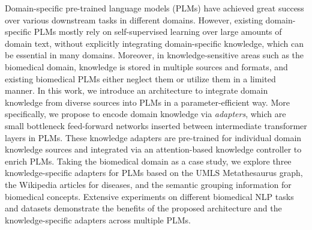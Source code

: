 Domain-specific pre-trained language models (PLMs) have achieved great success over various downstream tasks in different domains. However, existing domain-specific PLMs mostly rely on self-supervised learning over large amounts of domain text, without explicitly integrating domain-specific knowledge, which can be essential in many domains. Moreover, in knowledge-sensitive areas such as the biomedical domain, knowledge is stored in multiple sources and formats, and existing biomedical PLMs either neglect them or utilize them in a limited manner. In this work, we introduce an architecture to integrate domain knowledge from diverse sources into PLMs in a parameter-efficient way. More specifically, we propose to encode domain knowledge via \textit{adapters}, which are small bottleneck feed-forward networks inserted between intermediate transformer layers in PLMs. These knowledge adapters are pre-trained for individual domain knowledge sources and integrated via an attention-based knowledge controller to enrich PLMs. Taking the biomedical domain as a case study, we explore three knowledge-specific adapters for PLMs based on the UMLS Metathesaurus graph, the Wikipedia articles for diseases, and the semantic grouping information for biomedical concepts. Extensive experiments on different biomedical NLP tasks and datasets demonstrate the benefits of the proposed architecture and the knowledge-specific adapters across multiple PLMs.

